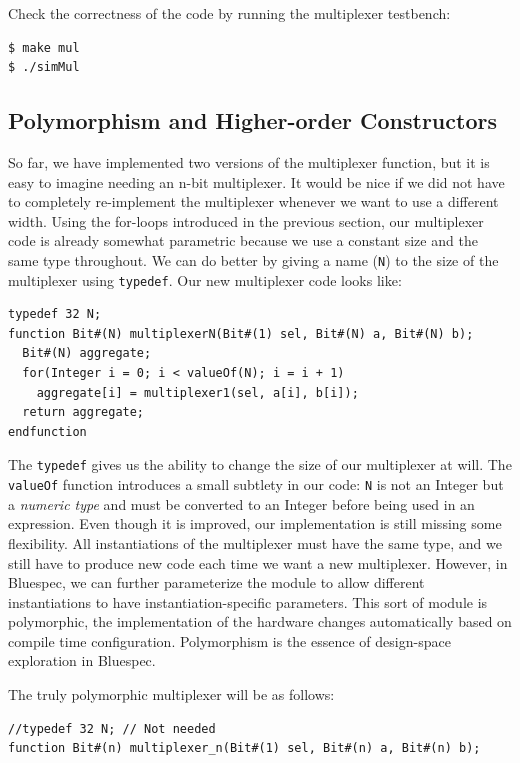 \documentclass{article}
\begin{document}
Check the correctness of the code by running the multiplexer testbench:

\begin{verbatim}
$ make mul
$ ./simMul
\end{verbatim}

\subsection{Polymorphism and Higher-order Constructors}

So far, we have implemented two versions of the multiplexer function, but it is
easy to imagine needing an n-bit multiplexer. It would be nice if we did not
have to completely re-implement the multiplexer whenever we want to use a
different width. Using the for-loops introduced in the previous section, our
multiplexer code is already somewhat parametric because we use a constant size
and the same type throughout. We can do better by giving a name (\texttt{N}) to
the size of the multiplexer using \texttt{typedef}.  Our new multiplexer code looks like:

\begin{verbatim}
typedef 32 N;
function Bit#(N) multiplexerN(Bit#(1) sel, Bit#(N) a, Bit#(N) b);
  Bit#(N) aggregate;
  for(Integer i = 0; i < valueOf(N); i = i + 1)
    aggregate[i] = multiplexer1(sel, a[i], b[i]);
  return aggregate;
endfunction
\end{verbatim}

The \texttt{typedef} gives us the ability to change the size of our multiplexer
at will. The \texttt{valueOf} function introduces a small subtlety in our code:
\texttt{N} is not an Integer but a \emph{numeric type} and must be converted to
an Integer before being used in an expression. Even though it is improved, our
implementation is still missing some flexibility. All instantiations of the
multiplexer must have the same type, and we still have to produce new code each
time we want a new multiplexer. However, in Bluespec, we can further
parameterize the module to allow different instantiations to have
instantiation-specific parameters. This sort of module is polymorphic, the
implementation of the hardware changes automatically based on compile time
configuration. Polymorphism is the essence of design-space exploration in
Bluespec.

The truly polymorphic multiplexer will be as follows:

\begin{verbatim}
//typedef 32 N; // Not needed
function Bit#(n) multiplexer_n(Bit#(1) sel, Bit#(n) a, Bit#(n) b);
\end{verbatim}
\end{document}
